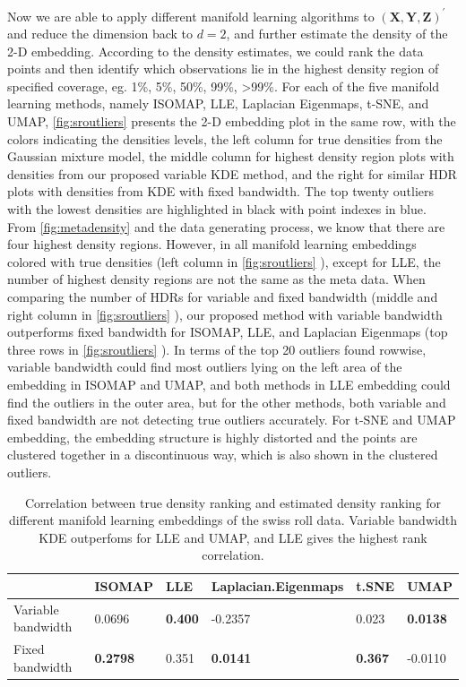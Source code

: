 \documentclass[11pt,a4paper,]{article}
\begin{document}
Now we are able to apply different manifold learning algorithms to \((\pmb{X}, \pmb{Y}, \pmb{Z})^\prime\) and reduce the dimension back to \(d=2\), and further estimate the density of the 2-D embedding. According to the density estimates, we could rank the data points and then identify which observations lie in the highest density region of specified coverage, eg. 1\%, 5\%, 50\%, 99\%, \textgreater99\%. For each of the five manifold learning methods, namely ISOMAP, LLE, Laplacian Eigenmaps, t-SNE, and UMAP, \autoref{fig:sroutliers} presents the 2-D embedding plot in the same row, with the colors indicating the densities levels,
the left column for true densities from the Gaussian mixture model, the middle column for highest density region plots with densities from our proposed variable KDE method, and the right for similar HDR plots with densities from KDE with fixed bandwidth. The top twenty outliers with the lowest densities are highlighted in black with point indexes in blue. From \autoref{fig:metadensity} and the data generating process, we know that there are four highest density regions. However, in all
manifold learning embeddings colored with true densities (left column in \autoref{fig:sroutliers} ), except for LLE, the number of highest density regions are not the same as the meta data. When comparing the number of HDRs for variable and fixed bandwidth (middle and right column in \autoref{fig:sroutliers} ), our proposed method with variable bandwidth outperforms fixed bandwidth for ISOMAP, LLE, and Laplacian Eigenmaps (top three rows in \autoref{fig:sroutliers} ). In terms of the top 20 outliers found rowwise, variable bandwidth could find most outliers lying on the left area of the embedding in ISOMAP and UMAP, and both methods in LLE embedding could find the outliers in the outer area, but for the other methods, both variable and fixed bandwidth are not detecting true outliers accurately. For t-SNE and UMAP embedding, the embedding structure is highly distorted and the points are clustered together in a discontinuous way, which is also shown in the clustered outliers.

\begin{table}

\caption{\label{tab:srcors}Correlation between true density ranking and estimated density ranking for different manifold learning embeddings of the swiss roll data. Variable bandwidth KDE outperfoms for LLE and UMAP, and LLE gives the highest rank correlation.}
\centering
\begin{tabular}[t]{l>{}l>{}l>{}l>{}l>{}l}
\toprule
  & ISOMAP & LLE & Laplacian.Eigenmaps & t.SNE & UMAP\\
\midrule
Variable bandwidth & 0.0696 & \textbf{0.400} & -0.2357 & 0.023 & \textbf{0.0138}\\
Fixed bandwidth & \textbf{0.2798} & 0.351 & \textbf{0.0141} & \textbf{0.367} & -0.0110\\
\bottomrule
\end{tabular}
\end{table}
\end{document}
